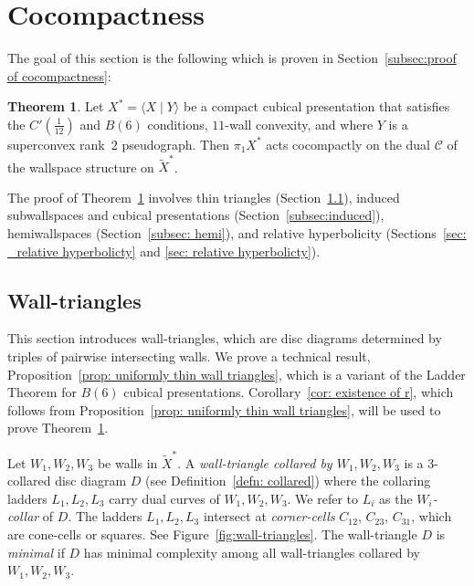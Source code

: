 \documentclass[12pt,oneside]{amsart}
\theoremstyle{definition}
\newtheorem{thm}{Theorem}[section]
\theoremstyle{definition}
\theoremstyle{remark}
\begin{document}

\section{Cocompactness}\label{sec:cocompact}




The goal of this section is the following which is proven in Section~\ref{subsec:proof of cocompactness}:

\begin{thm}\label{thm:cocompactness}
Let $X^*=\langle X \mid Y \rangle $ be a compact cubical presentation that satisfies the $C'(\frac{1}{12})$ and 
 $B(6)$ conditions, $11$-wall convexity, and where  $Y$ is a superconvex rank~$2$ pseudograph.
Then  $\pi_1 X^*$ acts 
cocompactly on  the dual $\mathcal{C}$ of the wallspace structure on $\widetilde X^*$.
\end{thm}



The proof of Theorem~\ref{thm:cocompactness} involves thin triangles (Section~\ref{sec: wall traingles}), induced subwallspaces and cubical presentations (Section~\ref{subsec:induced}), hemiwallspaces (Section~\ref{subsec: hemi}),  and relative hyperbolicity (Sections~\ref{sec: _relative hyperbolicty} and \ref{sec: relative hyperbolicty}). 




\subsection{Wall-triangles}\label{sec: wall traingles}

This section introduces wall-triangles, which are disc diagrams determined by  triples of pairwise intersecting walls. We prove a technical result, Proposition~\ref{prop: uniformly thin wall triangles}, which is a variant of the Ladder Theorem for  $B(6)$ cubical presentations. 
Corollary~\ref{cor: existence of r}, which follows from Proposition~\ref{prop: uniformly thin wall triangles}, will be used to prove Theorem~\ref{thm:cocompactness}. 

Let $W_1, W_2, W_3$ be walls in $\widetilde X^*$.
A \emph{wall-triangle collared by $W_1, W_2, W_3$} is a 3-collared disc diagram $D$ (see Definition~\ref{defn: collared}) where the collaring ladders $L_1, L_2, L_3$ carry dual curves of $W_1, W_2, W_3$. 
We refer to $L_i$ as the \emph{$W_i$-collar} of $D$.
The ladders $L_1, L_2, L_3$ intersect at \emph{corner-cells} $C_{12}$, $C_{23}$, $C_{31}$, which are cone-cells or squares.
See Figure~\ref{fig:wall-triangles}.
The wall-triangle $D$ is \emph{minimal} if $D$ has minimal complexity among all wall-triangles collared by $W_1, W_2, W_3$.
\end{document}
